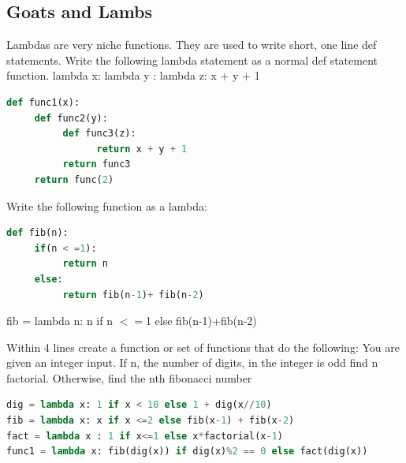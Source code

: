 \documentclass{article}
\begin{document}
\subsection{Goats and Lambs}
\begin{subq}
\subqs Lambdas are very niche functions. They are used to write short, one line def statements.  Write the following lambda statement as a normal def statement function. lambda x:  lambda y : lambda z: x + y + 1
\begin{solution}
\begin{lstlisting}[language = Python]
def func1(x):
     def func2(y):
          def func3(z):
                return x + y + 1
          return func3
     return func(2)
\end{lstlisting}\end{solution}
\newpage
\subqs Write the following function as a lambda: 
\begin{lstlisting}[language = Python]
def fib(n):
     if(n < =1):
          return n
     else:
          return fib(n-1)+ fib(n-2)
\end{lstlisting}
\begin{solution}
fib = lambda n: n if n $<=$1 else fib(n-1)+fib(n-2)

\end{solution}
\subqs Within 4 lines create a function or set of functions that do the following: 
You are given an integer input. If n, the number of digits, in the integer is odd find n factorial. Otherwise, find the nth fibonacci number
\begin{solution}
\begin{lstlisting}[language = Python]
dig = lambda x: 1 if x < 10 else 1 + dig(x//10)
fib = lambda x: x if x <=2 else fib(x-1) + fib(x-2)
fact = lambda x : 1 if x<=1 else x*factorial(x-1)
func1 = lambda x: fib(dig(x)) if dig(x)%2 == 0 else fact(dig(x))
\end{lstlisting}
\end{solution}
\end{subq}
\end{document}
